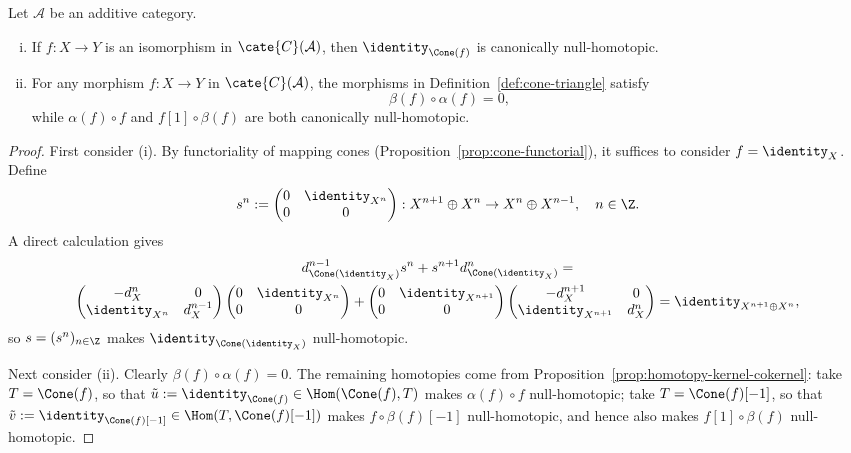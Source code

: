 \begin{proposition}\label{prop:cone-homotopy}
	Let $\mathcal{A}$ be an additive category.
	\begin{enumerate}[(i)]
		\item If $f:X\to Y$ is an isomorphism in $\cate{C}(\mathcal{A})$,
		then $\identity_{\Cone(f)}$ is canonically null-homotopic.
		\item For any morphism $f:X\to Y$ in $\cate{C}(\mathcal{A})$, the
		morphisms in Definition~\ref{def:cone-triangle} satisfy
		\[ \beta(f) \circ \alpha(f) = 0, \]
		while $\alpha(f)\circ f$ and $f[1]\circ\beta(f)$ are both
		canonically null-homotopic.
	\end{enumerate}
\end{proposition}
\begin{proof}
	First consider (i). By functoriality of mapping cones
	(Proposition~\ref{prop:cone-functorial}), it suffices to consider
	$f=\identity_X$. Define
	\[ s^n := \begin{pmatrix} 0 & \identity_{X^n} \\ 0 & 0 \end{pmatrix} : X^{n+1} \oplus X^n \to X^n \oplus X^{n-1}, \quad n \in \Z. \]
	A direct calculation gives
	\begin{multline*}
		d^{n-1}_{\Cone(\identity_X)} s^n + s^{n+1} d^n_{\Cone(\identity_X)} = \\
		\begin{pmatrix} -d_X^n & 0 \\ \identity_{X^n} & d_X^{n-1} \end{pmatrix} \begin{pmatrix} 0 & \identity_{X^n} \\ 0 & 0 \end{pmatrix}  + \begin{pmatrix} 0 & \identity_{X^{n+1}} \\ 0 & 0 \end{pmatrix} \begin{pmatrix} -d_X^{n+1} & 0 \\ \identity_{X^{n+1}} & d_X^n \end{pmatrix}
		= \identity_{X^{n+1} \oplus X^n},
	\end{multline*}
	so $s=(s^n)_{n\in\Z}$ makes $\identity_{\Cone(\identity_X)}$
	null-homotopic.

	Next consider (ii). Clearly $\beta(f)\circ\alpha(f)=0$. The remaining
	homotopies come from Proposition~\ref{prop:homotopy-kernel-cokernel}: take
	$T=\Cone(f)$, so that
	$\tilde{u}:=\identity_{\Cone(f)}\in\Hom(\Cone(f),T)$ makes
	$\alpha(f)\circ f$ null-homotopic; take $T=\Cone(f)[-1]$, so that
	$\tilde{v}:=\identity_{\Cone(f)[-1]}\in\Hom(T,\Cone(f)[-1])$ makes
	$f\circ\beta(f)[-1]$ null-homotopic, and hence also makes
	$f[1]\circ\beta(f)$ null-homotopic.
\end{proof}

